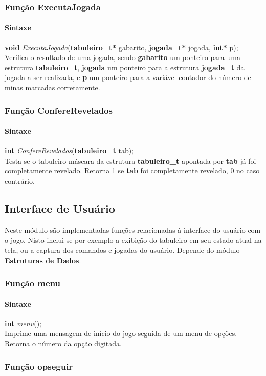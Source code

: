 \documentclass[10pt,a4paper]{report}
\begin{document}
\subsubsection{Função ExecutaJogada}
\paragraph{Sintaxe}
\textbf{void} {\it ExecutaJogada}(\textbf{tabuleiro\_t*} gabarito, \textbf{jogada\_t*} jogada, \textbf{int*} p);\\
Verifica o resultado de uma jogada, sendo \textbf{gabarito} um ponteiro para uma estrutura \textbf{tabuleiro\_t}, \textbf{jogada} um ponteiro para a estrutura \textbf{jogada\_t} da jogada a ser realizada, e \textbf{p} um ponteiro para a variável contador do número de minas marcadas corretamente.
\subsubsection{Função ConfereRevelados}
\paragraph{Sintaxe}
\textbf{int} {\it ConfereRevelados}(\textbf{tabuleiro\_t} tab);\\
Testa se o tabuleiro máscara da estrutura \textbf{tabuleiro\_t} apontada por \textbf{tab} já foi completamente revelado. Retorna 1 se \textbf{tab} foi completamente revelado, 0 no caso contrário.
\subsection{Interface de Usuário}
Neste módulo são implementadas funções relacionadas à interface do usuário com o jogo. Nisto inclui-se por exemplo a exibição do tabuleiro em seu estado atual na tela, ou a captura dos comandos e jogadas do usuário. Depende do módulo \textbf{Estruturas de Dados}.
\subsubsection{Função menu}
\paragraph{Sintaxe}
\textbf{int} {\it menu}();\\
Imprime uma mensagem de início do jogo seguida de um menu de opções. Retorna o número da opção digitada.
\subsubsection{Função opseguir}
\end{document}
